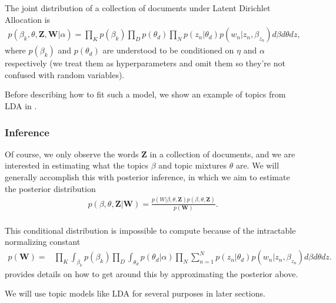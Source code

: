 The joint distribution of a collection of documents under Latent Dirichlet Allocation is
\begin{align}
  p(\beta_k, \theta, \bm Z, \bm W | \alpha) = 
  \prod_K p(\beta_k)
  \prod_D p(\theta_d) \prod_N p(z_n | \theta_d) p(w_n | z_n, \beta_{z_n}) d\beta d\theta dz,
\end{align}
where $p(\beta_k)$ and $p(\theta_d)$ are understood to be conditioned
on $\eta$ and $\alpha$ respectively (we treat them as hyperparameters
and omit them so they're not confused with random variables).

Before describing how to fit such a model, we show an example of
topics from LDA in \myfig{}.

\begin{figure}
\end{figure}

\subsubsection{Inference}
Of course, we only observe the words $\bm Z$ in a collection of
documents, and we are interested in estimating what the topics $\beta$
and topic mixtures $\theta$ are.  We will generally accomplish this
with posterior inference, in which we aim to estimate the
posterior distribution
\begin{align}
  p(\beta, \theta, \bm Z | \bm W) = \frac{p(W | \beta, \theta, \bm Z) p(\beta, \theta, \bm Z)}{p(\bm W)}. \\
\end{align}

This conditional distribution is impossible to compute because of the
intractable normalizing constant
\begin{align} 
  p(\bm W) = & \prod_K \int_{\beta_k} p(\beta_k)
  \prod_D \int_{\theta_d} p(\theta_d | \alpha) \prod_N \sum_{n=1}^N p(z_n | \theta_d) p(w_n | z_n, \beta_{z_n}) d\beta d\theta dz.
\end{align}
 provides details on how to get around
this by approximating the posterior above.

We will use topic models like LDA for several purposes in later
sections.


